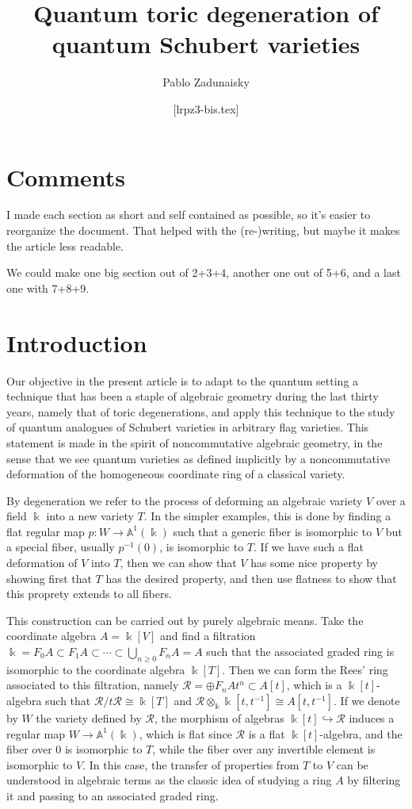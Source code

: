 \documentclass[11pt,fleqn]{article}
\title{Quantum toric degeneration of quantum Schubert varieties}
\date{[lrpz3-bis.tex]}
\author{Pablo Zadunaisky}
\newcommand\ot{\otimes}
\renewcommand\to{\longrightarrow}
\renewcommand\k{\Bbbk}
\renewcommand\AA{\mathbb A}
\begin{document}
\maketitle



\section*{Comments}
I made each section as short and self contained as possible, so it's easier to reorganize
the document. That helped with the (re-)writing, but maybe it makes the article less 
readable.

We could make one big section out of 2+3+4, another one out of 5+6, and a last one with
7+8+9.


\section{Introduction}
Our objective in the present article is to adapt to the quantum setting a technique that 
has been a staple of algebraic geometry during the last thirty years, namely that of 
toric degenerations, and apply this technique to the study of quantum analogues of 
Schubert varieties in arbitrary flag varieties. This statement is made in the spirit of 
noncommutative algebraic geometry, in the sense that we see quantum varieties as defined 
implicitly by a noncommutative deformation of the homogeneous coordinate ring of a 
classical variety.

By degeneration we refer to the process of deforming an algebraic variety $V$ over a 
field $\k$ into a new variety $T$. In the simpler examples, this is done by finding a 
flat regular map $p: W \to \AA^1(\k)$ such that a generic fiber is 
isomorphic to $V$ but a special fiber, usually $p^{-1}(0)$, is isomorphic to $T$. If we 
have such a flat deformation of $V$ into $T$, then we can show that $V$ has some nice 
property by showing first that $T$ has the desired property, and then use flatness to 
show that this proprety extends to all fibers.

This construction can be carried out by purely algebraic means. Take the 
coordinate algebra $A = \k[V]$ and find a filtration $\k = F_0A \subset F_1 A \subset 
\cdots \subset \bigcup_{n \geq 0} F_nA = A$ such that the associated graded ring is 
isomorphic to the coordinate algebra $\k[T]$. Then we can form the Rees' ring associated 
to this filtration, namely $\mathcal R = \oplus F_nA t^n \subset A[t]$, which is a 
$\k[t]$-algebra such that $\mathcal R / t \mathcal R \cong \k[T]$ and $\mathcal R \ot_\k 
\k[t, t^{-1}] \cong A[t,t^{-1}]$. If we denote by $W$ the variety defined by $\mathcal 
R$, the morphism of algebras $\k[t] \hookrightarrow \mathcal R$ induces a regular map $W 
\to \AA^1(\k)$, which is flat since $\mathcal R$ is a flat $\k[t]$-algebra, and the 
fiber over $0$ is isomorphic to $T$, while the fiber over any invertible element is 
isomorphic to $V$. In this case, the transfer of properties from $T$ to $V$ can be 
understood in algebraic terms as the classic idea of studying a ring $A$ by 
filtering it and passing to an associated graded ring.
\end{document}
